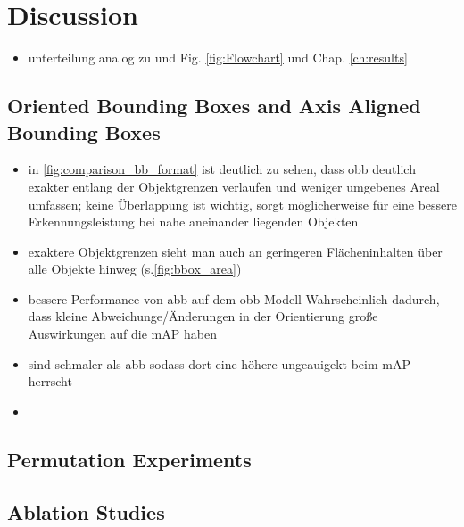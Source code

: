 \chapter{Discussion}
\label{ch:discussion}
\begin{itemize}
    \item unterteilung analog zu  und Fig. \ref{fig:Flowchart} und Chap. \ref{ch:results}
\end{itemize}

\section{Oriented Bounding Boxes and Axis Aligned Bounding Boxes}
\begin{itemize}
    \item in \ref{fig:comparison_bb_format} ist deutlich zu sehen, dass \acrshort{obb} deutlich exakter entlang der Objektgrenzen verlaufen und weniger umgebenes Areal umfassen; keine Überlappung ist wichtig, sorgt möglicherweise für eine bessere Erkennungsleistung bei nahe aneinander liegenden Objekten
    \item exaktere Objektgrenzen sieht man auch an geringeren Flächeninhalten über alle Objekte hinweg (s.\ref{fig:bbox_area})
    \item bessere Performance von \acrshort{abb} auf dem \acrshort{obb} Modell Wahrscheinlich dadurch, dass kleine Abweichunge/Änderungen in der Orientierung große Auswirkungen auf die \acrshort{mAP} haben
    \item {} sind schmaler als \acrshort{abb} sodass dort eine höhere ungeauigekt beim \acrshort{mAP} herrscht
    \item {}
\end{itemize}
\section{Permutation Experiments}
\section{Ablation Studies}